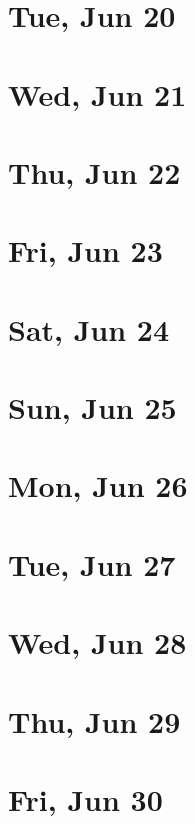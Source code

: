 	\section{Tue, Jun 20}
		
		
	\section{Wed, Jun 21}
		
		
	\section{Thu, Jun 22}
		
		
	\section{Fri, Jun 23}
		
		
	\section{Sat, Jun 24}
		
		
	\section{Sun, Jun 25}
		
		
	\section{Mon, Jun 26}
		
		
	\section{Tue, Jun 27}
		
		
	\section{Wed, Jun 28}
		
		
	\section{Thu, Jun 29}
		
		
	\section{Fri, Jun 30}
		
		
